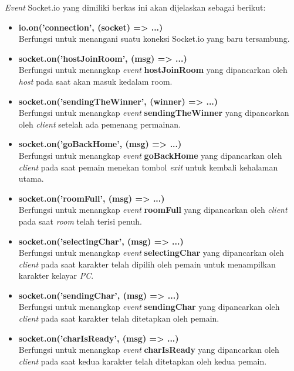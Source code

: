 \begin{enumerate}
\begin{enumerate}
		\textit{Event} Socket.io yang dimiliki berkas ini akan dijelaskan sebagai berikut:
		\begin{itemize}
			\item \textbf{io.on('connection', (socket) => {...})} \\
			Berfungsi untuk menangani suatu koneksi Socket.io yang baru tersambung.
			
			\item \textbf{socket.on('hostJoinRoom', (msg) => {...})} \\ 
			Berfungsi untuk menangkap \textit{event} \textbf{hostJoinRoom} yang dipancarkan oleh \textit{host} pada saat akan masuk kedalam room.
			
			\item \textbf{socket.on('sendingTheWinner', (winner) => {...})} \\
			Berfungsi untuk menangkap \textit{event} \textbf{sendingTheWinner} yang dipancarkan oleh \textit{client} setelah ada pemenang permainan.
			
			\item \textbf{socket.on('goBackHome', (msg) => {...})} \\
			Berfungsi untuk menangkap \textit{event} \textbf{goBackHome} yang dipancarkan oleh \textit{client} pada saat pemain menekan tombol \textit{exit} untuk kembali kehalaman utama.
			
			\item \textbf{socket.on('roomFull', (msg) => {...})} \\
			Berfungsi untuk menangkap \textit{event} \textbf{roomFull} yang dipancarkan oleh \textit{client} pada saat \textit{room} telah terisi penuh.
			
			\item \textbf{socket.on('selectingChar', (msg) => {...})} \\
			Berfungsi untuk menangkap \textit{event} \textbf{selectingChar} yang dipancarkan oleh \textit{client} pada saat karakter telah dipilih oleh pemain untuk menampilkan karakter kelayar \textit{PC}.
			
			\item \textbf{socket.on('sendingChar', (msg) => {...})} \\
			Berfungsi untuk menangkap \textit{event} \textbf{sendingChar} yang dipancarkan oleh \textit{client} pada saat karakter telah ditetapkan oleh pemain.
			
			\item \textbf{socket.on('charIsReady', (msg) => {...})} \\
			Berfungsi untuk menangkap \textit{event} \textbf{charIsReady} yang dipancarkan oleh \textit{client} pada saat kedua karakter telah ditetapkan oleh kedua pemain.
			

\end{itemize}
\end{enumerate}
\end{enumerate}

